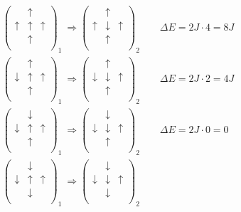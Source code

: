 \begin{align*}
    &\begin{pmatrix} &\uparrow&\\ \uparrow&\uparrow&\uparrow\\ &\uparrow&\\\end{pmatrix}_1 \ \Longrightarrow
    \begin{pmatrix} &\uparrow&\\ \uparrow&\downarrow&\uparrow\\ &\uparrow&\\\end{pmatrix}_2 \qquad
    \Delta E = 2J\cdot4 = 8J& \\
    &\begin{pmatrix} &\uparrow&\\ \downarrow&\uparrow&\uparrow\\ &\uparrow&\\\end{pmatrix}_1 \ \Longrightarrow
    \begin{pmatrix} &\uparrow&\\ \downarrow&\downarrow&\uparrow\\ &\uparrow&\\\end{pmatrix}_2 \qquad
    \Delta E = 2J\cdot2 = 4J& \\
    &\begin{pmatrix} &\downarrow&\\ \downarrow&\uparrow&\uparrow\\ &\uparrow&\\\end{pmatrix}_1 \ \Longrightarrow
    \begin{pmatrix} &\downarrow&\\ \downarrow&\downarrow&\uparrow\\ &\uparrow&\\\end{pmatrix}_2 \qquad
    \Delta E = 2J\cdot0 = 0& \\
    &\begin{pmatrix} &\downarrow&\\ \downarrow&\uparrow&\uparrow\\ &\downarrow&\\\end{pmatrix}_1 \ \Longrightarrow
    \begin{pmatrix} &\downarrow&\\ \downarrow&\downarrow&\uparrow\\ &\downarrow&\\\end{pmatrix}_2 \qquad

\end{align*}
